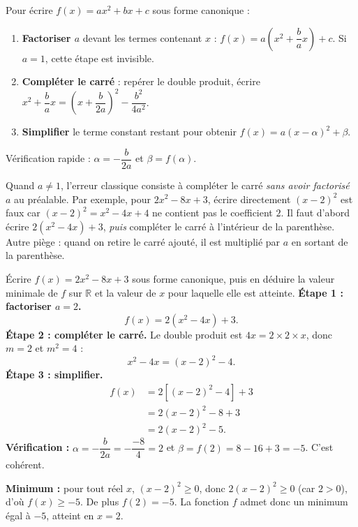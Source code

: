 \documentclass[11pt]{article}
\newcommand{\cle}[1]{{\popxbold\color{popdark}#1}}
\begin{document}
\begin{methode}
Pour écrire $f(x) = ax^2 + bx + c$ sous forme canonique :
\begin{enumerate}
\item \textbf{Factoriser $a$} devant les termes contenant $x$ : $f(x) = a\left(x^2 + \dfrac{b}{a}x\right) + c$. Si $a = 1$, cette étape est invisible.
\item \textbf{Compléter le carré} : repérer le double produit, écrire $x^2 + \dfrac{b}{a}x = \left(x + \dfrac{b}{2a}\right)^2 - \dfrac{b^2}{4a^2}$.
\item \textbf{Simplifier} le terme constant restant pour obtenir $f(x) = a(x-\alpha)^2 + \beta$.
\end{enumerate}
Vérification rapide : $\alpha = -\dfrac{b}{2a}$ et $\beta = f(\alpha)$.
\end{methode}

\begin{attention}
Quand $a \neq 1$, l'erreur classique consiste à compléter le carré \emph{sans avoir factorisé $a$} au préalable. Par exemple, pour $2x^2 - 8x + 3$, écrire directement $(x-2)^2$ est faux car $(x-2)^2 = x^2 - 4x + 4$ ne contient pas le coefficient $2$. Il faut d'abord écrire $2(x^2 - 4x) + 3$, \emph{puis} compléter le carré à l'intérieur de la parenthèse. Autre piège : quand on retire le carré ajouté, il est multiplié par $a$ en sortant de la parenthèse.
\end{attention}

\begin{exoresolu}
Écrire $f(x) = 2x^2 - 8x + 3$ sous forme canonique, puis en déduire la valeur minimale de $f$ sur $\mathbb{R}$ et la valeur de $x$ pour laquelle elle est atteinte.
\tcblower
\textbf{Étape 1 : factoriser $a = 2$.}
\[ f(x) = 2\left(x^2 - 4x\right) + 3. \]
\textbf{Étape 2 : compléter le carré.} Le double produit est $4x = 2 \times 2 \times x$, donc $m = 2$ et $m^2 = 4$ :
\[ x^2 - 4x = (x-2)^2 - 4. \]
\textbf{Étape 3 : simplifier.}
\begin{align*}
f(x) &= 2\left[(x-2)^2 - 4\right] + 3 \\
&= 2(x-2)^2 - 8 + 3 \\
&= 2(x-2)^2 - 5.
\end{align*}
\textbf{Vérification :} $\alpha = -\dfrac{b}{2a} = -\dfrac{-8}{4} = 2$ et $\beta = f(2) = 8 - 16 + 3 = -5$. C'est cohérent.

\textbf{Minimum :} pour tout réel $x$, $(x-2)^2 \geq 0$, donc $2(x-2)^2 \geq 0$ (car $2 > 0$), d'où $f(x) \geq -5$. De plus $f(2) = -5$. La fonction $f$ admet donc un \cle{minimum} égal à $-5$, atteint en $x = 2$.
\end{exoresolu}
\end{document}
